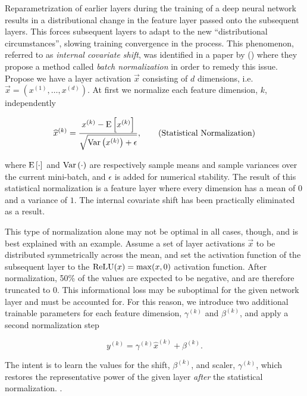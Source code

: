 Reparametrization of earlier layers during the training of a deep neural network results in a distributional change in the feature layer passed onto the subsequent layers.
This forces subsequent layers to adapt to the new \enquote{distributional circumstances}, slowing training convergence in the process.
This phenomenon, referred to as \textit{internal covariate shift}, was identified in a paper \cite{batch-normalization} by \citeauthor{batch-normalization} (\citeyear{batch-normalization}) where they propose a method called \textit{batch normalization} in order to remedy this issue.
Propose we have a layer activation $\vec{x}$ consisting of $d$ dimensions, i.e. $\vec{x} = (x^{(1)}, \ldots, x^{(d)})$.
At first we normalize each feature dimension, $k$, independently

\begin{equation*}
  \widehat{x}^{(k)}
  =
  \frac{
    x^{(k)} - \mathrm{E} \left[x^{(k)} \right]
  }{
    \sqrt{\mathrm{Var} \left(x^{(k)} \right) + \epsilon}
  },
  \tag{Statistical Normalization}
\end{equation*}

where $\mathrm{E} \left[\cdot \right]$ and $\mathrm{Var} \left(\cdot \right)$ are respectively sample means and sample variances over the current mini-batch, and $\epsilon$ is added for numerical stability.
The result of this statistical normalization is a feature layer where every dimension has a mean of $0$ and a variance of $1$.
The internal covariate shift has been practically eliminated as a result.

This type of normalization alone may not be optimal in all cases, though, and is best explained with an example.
Assume a set of layer activations $\vec{x}$ to be distributed symmetrically across the mean, and set the activation function of the subsequent layer to the $\mathrm{ReLU}(x) = \max(x,0)$ activation function.
After normalization, 50\% of the values are expected to be negative, and are therefore truncated to $0$.
This informational loss may be suboptimal for the given network layer and must be accounted for.
For this reason, we introduce two additional trainable parameters for each feature dimension, $\gamma^{(k)}$ and $\beta^{(k)}$, and apply a second normalization step

\begin{equation*}
  y^{(k)} = \gamma^{(k)} \widehat{x}^{(k)} + \beta^{(k)}.
  \tag{Trainable Normalization}
\end{equation*}

The intent is to learn the values for the shift, $\beta^{(k)}$, and scaler, $\gamma^{(k)}$, which restores the representative power of the given layer \textit{after} the statistical normalization.
.
